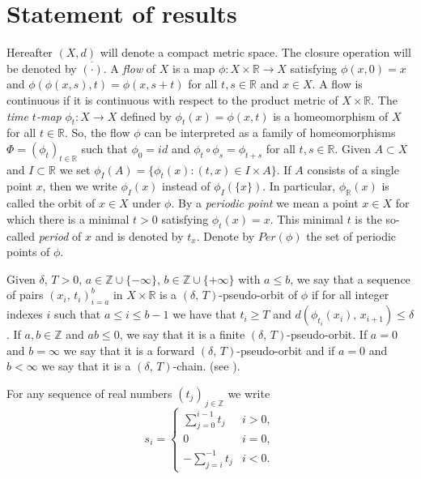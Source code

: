 \documentclass{amsart}
\theoremstyle{definition}
\begin{document}
\section{Statement of results}

Hereafter $(X,d)$ will denote a compact metric space. The closure operation will be denoted by $\overline{(\cdot)}$. A {\em flow} of $X$ is a map $\phi\colon X\times \mathbb{R}\rightarrow X$ satisfying $\phi(x,0)=x$ and $\phi(\phi(x, s),t)=\phi(x, s+t)$ for all $t, s\in \mathbb{R}$ and $x\in X$.
A flow is continuous if it is continuous with respect to the product metric of $X\times \mathbb{R}$. The \emph{time $t$-map} $\phi_t\colon X\rightarrow X$ defined by $\phi_t(x)=\phi(x,t)$ is a
homeomorphism of $X$ for all $t\in \mathbb{R}$. So, the flow $\phi$ can be interpreted as a family of homeomorphisms $\Phi=( \phi_t)_{t\in \mathbb{R}}$ such that
$\phi_0=id$ and $\phi_t\circ \phi_s=\phi_{t+s}$ for all $t,s\in \mathbb{R}$.  Given $A\subset X$ and $I\subset \mathbb{R}$ we set $\phi_I(A)=\{\phi_t(x):(t,x)\in I\times A\}$. If $A$ consists of a single point $x$, then we write
$\phi_I(x)$ instead of $\phi_I(\{x\})$. In particular, $\phi_{\mathbb{R}}(x)$ is called the orbit of $x\in X$ under $\phi$. By a \emph{periodic point} we mean a point $x\in X$ for which there is a minimal $t>0$ satisfying $\phi_{t}(x)=x$. This minimal $t$ is the so-called \emph{period} of $x$ and is denoted by $t_x$. Denote by $Per(\phi)$ the set of periodic points of $\phi$.

  
Given $\delta$, $T > 0$, $a\in \mathbb{Z}\cup\{-\infty\}$, $b\in\mathbb{Z}\cup\{+\infty\}$ with $a\leq b$, we say that a sequence of pairs $(x_i,\, t_i)_{i=a}^b$ in $X\times\mathbb{R}$ is a $(\delta,\, T)$-pseudo-orbit of $\phi$ if for all integer indexes $i$ such that $a\leq i \leq b-1$ we have that $t_i \geq T$ and
$d(\phi_{t_i}(x_i),\, x_{i+1}) \leq \delta$. If $a,b\in\mathbb{Z}$ and $ab\leq 0$, we say that it is a finite $(\delta,\, T)$-pseudo-orbit. If $a = 0$ and $b=\infty$ we say that it is a forward $(\delta,\,T)$-pseudo-orbit and if $a = 0$ and $b<\infty$ we say that it is a $(\delta,\,T)$-chain. (see \cite{Komuro84, Thomas84}). 

For any sequence of real numbers $(t_j)_{\,j\in \mathbb{Z}}$ we write
    \[s_i =
      \begin{cases}
        \displaystyle{\sum_{j=0}^{i-1}} t_j & i > 0,\\
		    0				             & i = 0, \\
		    -\displaystyle{\sum_{j=i}^{-1}} t_j & i < 0.
      \end{cases}
    \]
    
\end{document}
